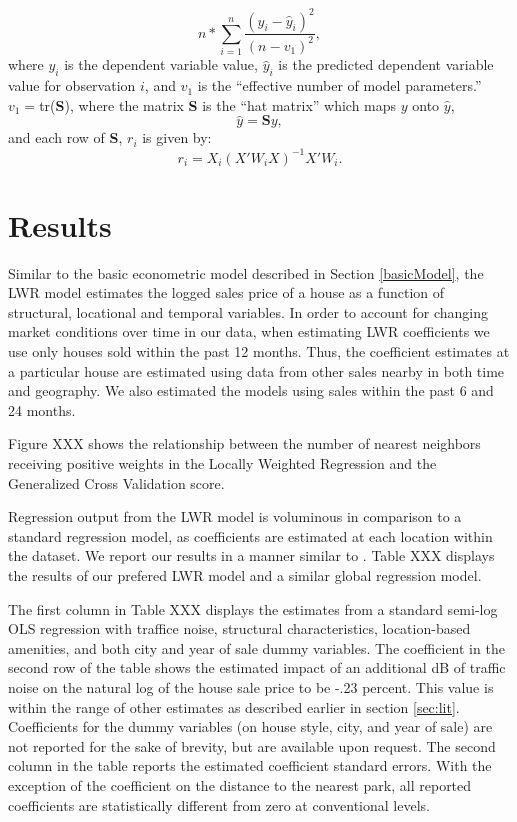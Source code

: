 \documentclass{article}\usepackage{graphicx, color}
\begin{document}
\begin{equation}\label{eq:GCV}
n*\sum_{i=1}^{n}\frac{(y_i-\hat{y}_i)^2}{(n-v_1)^2}, 
\end{equation} 
where $y_i$ is the dependent variable value, $\hat{y}_i$ is the predicted dependent variable value for observation $i$, and $v_1$ is the ``effective number of model parameters.''
$v_1=$tr(\textbf{S}), where the matrix \textbf{S} is the ``hat matrix'' which maps $y$ onto $\hat{y}$,
                   \begin{equation*}
                   \hat{y}=\textbf{S}y,
                   \end{equation*}
                   and each row of \textbf{S}, $r_i$ is given by:
                     \begin{equation*}
                   r_i=X_i(X'W_iX)^{-1}X'W_i.
                   \end{equation*}                
\section{Results}
Similar to the basic econometric model described in Section \ref{basicModel}, the LWR model estimates the logged sales price of a house as a function of structural, locational and temporal variables. In order to account for changing market conditions over time in our data, when estimating LWR coefficients we use only houses sold within the past 12 months. Thus, the coefficient estimates at a particular house are estimated using data from other sales nearby in both time and geography. We also estimated the models using sales within the past 6 and 24 months. 

Figure XXX shows the relationship between the number of nearest neighbors receiving positive weights in the Locally Weighted Regression and the Generalized Cross Validation score. 

Regression output from the LWR model is voluminous in comparison to a standard regression model, as coefficients are estimated at each location within the dataset. We report our results in a manner similar to \citet{MarmolejoDuarteCarlos;GonzalezTamez2009}. Table XXX displays the results of our prefered LWR model and a similar global regression model.



The first column in Table XXX displays the estimates from a standard semi-log OLS regression with traffice noise, structural characteristics, location-based amenities, and both city and year of sale dummy variables. The coefficient in the second row of the table shows the estimated impact of an additional dB of traffic noise on the natural log of the house sale price to be -.23 percent. This value is within the range of other estimates as described earlier in section \ref{sec:lit}. Coefficients for the dummy variables (on house style, city, and year of sale) are not reported for the sake of brevity, but are available upon request. The second column in the table reports the estimated coefficient standard errors. With the exception of the coefficient on the distance to the nearest park, all reported coefficients are statistically different from zero at conventional levels. 
\end{document}
